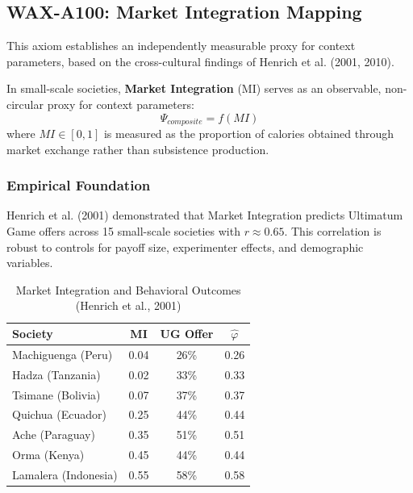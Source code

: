 
\subsection{WAX-A100: Market Integration Mapping}
\label{sec:wax-a100}

This axiom establishes an independently measurable proxy for context parameters, based on the cross-cultural findings of Henrich et al. (2001, 2010).

\begin{axiom}
\label{ax:market-integration}
In small-scale societies, \textbf{Market Integration} (MI) serves as an observable, non-circular proxy for context parameters:
\begin{equation}
\Psi_{composite} = f(MI)
\end{equation}
where $MI \in [0,1]$ is measured as the proportion of calories obtained through market exchange rather than subsistence production.
\end{axiom}

\subsubsection{Empirical Foundation}

Henrich et al. (2001) demonstrated that Market Integration predicts Ultimatum Game offers across 15 small-scale societies with $r \approx 0.65$. This correlation is robust to controls for payoff size, experimenter effects, and demographic variables.

\begin{table}[htbp]
\centering
\caption{Market Integration and Behavioral Outcomes (Henrich et al., 2001)}
\label{tab:mi-data}
\renewcommand{\arraystretch}{1.2}
\begin{tabular}{@{}lccc@{}}
\toprule
\textbf{Society} & \textbf{MI} & \textbf{UG Offer} & $\hat{\varphi}$ \\
\midrule
Machiguenga (Peru) & 0.04 & 26\% & 0.26 \\
Hadza (Tanzania) & 0.02 & 33\% & 0.33 \\
Tsimane (Bolivia) & 0.07 & 37\% & 0.37 \\
Quichua (Ecuador) & 0.25 & 44\% & 0.44 \\
Ache (Paraguay) & 0.35 & 51\% & 0.51 \\
Orma (Kenya) & 0.45 & 44\% & 0.44 \\
Lamalera (Indonesia) & 0.55 & 58\% & 0.58 \\
\bottomrule
\end{tabular}
\end{table}

